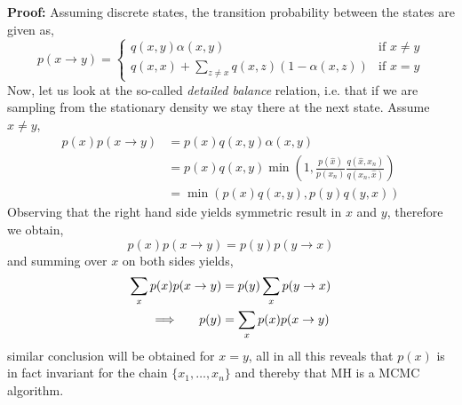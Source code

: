 \begin{testexample}
    \textbf{Proof:} Assuming discrete states, the transition probability between the states are given as, 
    $$p(x\rightarrow y) = \begin{cases}
        q(x,y)\alpha(x,y) & \text{if } x\neq y\\
        q(x,x) + \sum_{z\neq x} q(x,z)(1-\alpha(x,z)) & \text{if } x=y
    \end{cases}$$
    Now, let us look at the so-called \textit{detailed balance} relation, i.e. that if we are sampling from the
    stationary density we stay there at the next state. Assume $x\neq y$, 
    \begin{align*}
        p(x)p(x\rightarrow y) &= p(x)q(x,y)\alpha(x,y)\\
        &=p(x)q(x,y) \min \left(1, \frac{p(\hat x)}{p(x_n)} \frac{q(\hat x, x_n)}{q(x_n,\hat x)}\right)\\
        &= \min(p(x)q(x,y), p(y)q(y,x))
    \end{align*}
    Observing that the right hand side yields symmetric result in $x$ and $y$, therefore we obtain, 
    $$p(x)p(x\rightarrow y) = p(y)p(y\rightarrow x)$$
    and summing over $x$ on both sides yields,
    \begin{align}
        \sum_x p(x)p(x\rightarrow y) &= p(y) \sum_x p(y\rightarrow x)\\
        \implies \hspace{0.5cm} p(y) &= \sum_x p(x)p(x\rightarrow y)
    \end{align}
    similar conclusion will be obtained for $x = y$, all in all this reveals that $p(x)$ is in fact invariant for the chain
     $\{x_1, \dots , x_n\}$ and thereby that MH is a MCMC algorithm. 
\end{testexample}






